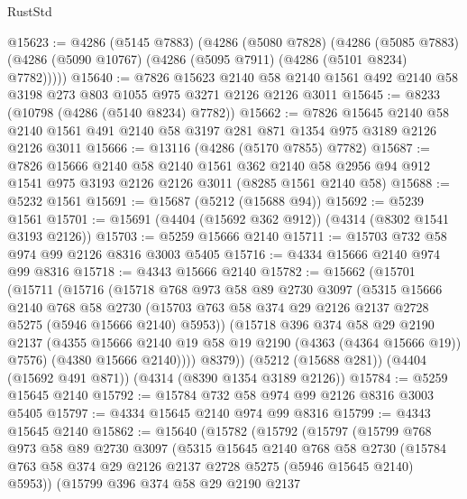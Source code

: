\begin{lexlean}{RustStd}
\begin{coremodule}
{\begin{coremodule}
{{{{{{{{{{{{{{{{@15623 := @4286
    (@5145 @7883)
    (@4286
      (@5080 @7828)
      (@4286
        (@5085 @7883)
        (@4286 (@5090 @10767) (@4286 (@5095 @7911) (@4286 (@5101 @8234) @7782)))))
@15640 := @7826
    @15623
    @2140
    @58
    @2140
    @1561
    @492
    @2140
    @58
    @3198
    @273
    @803
    @1055
    @975
    @3271
    @2126
    @2126
    @3011
@15645 := @8233 (@10798 (@4286 (@5140 @8234) @7782))
@15662 := @7826
    @15645
    @2140
    @58
    @2140
    @1561
    @491
    @2140
    @58
    @3197
    @281
    @871
    @1354
    @975
    @3189
    @2126
    @2126
    @3011
@15666 := @13116 (@4286 (@5170 @7855) @7782)
@15687 := @7826
    @15666
    @2140
    @58
    @2140
    @1561
    @362
    @2140
    @58
    @2956
    @94
    @912
    @1541
    @975
    @3193
    @2126
    @2126
    @3011
    (@8285 @1561 @2140 @58)
@15688 := @5232 @1561
@15691 := @15687 (@5212 (@15688 @94))
@15692 := @5239 @1561
@15701 := @15691 (@4404 (@15692 @362 @912)) (@4314 (@8302 @1541 @3193 @2126))
@15703 := @5259 @15666 @2140
@15711 := @15703 @732 @58 @974 @99 @2126 @8316 @3003 @5405
@15716 := @4334 @15666 @2140 @974 @99 @8316
@15718 := @4343 @15666 @2140
@15782 := @15662
    (@15701
      (@15711
        (@15716
          (@15718
            @768
            @973
            @58
            @89
            @2730
            @3097
            (@5315
              @15666
              @2140
              @768
              @58
              @2730
              (@15703 @763 @58 @374 @29 @2126 @2137 @2728 @5275 (@5946 @15666 @2140) @5953))
            (@15718
              @396
              @374
              @58
              @29
              @2190
              @2137
              (@4355 @15666 @2140 @19 @58 @19 @2190 (@4363 (@4364 @15666 @19)) @7576)
              (@4380 @15666 @2140))))
        @8379))
    (@5212 (@15688 @281))
    (@4404 (@15692 @491 @871))
    (@4314 (@8390 @1354 @3189 @2126))
@15784 := @5259 @15645 @2140
@15792 := @15784 @732 @58 @974 @99 @2126 @8316 @3003 @5405
@15797 := @4334 @15645 @2140 @974 @99 @8316
@15799 := @4343 @15645 @2140
@15862 := @15640
    (@15782
      (@15792
        (@15797
          (@15799
            @768
            @973
            @58
            @89
            @2730
            @3097
            (@5315
              @15645
              @2140
              @768
              @58
              @2730
              (@15784 @763 @58 @374 @29 @2126 @2137 @2728 @5275 (@5946 @15645 @2140) @5953))
            (@15799
              @396
              @374
              @58
              @29
              @2190
              @2137
}}}}}}}}}}}}}}}}
\end{coremodule}}
\end{coremodule}
\end{lexlean}
